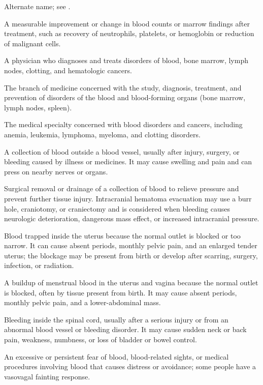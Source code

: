  Alternate name; see .

 A measurable improvement or change in blood counts or marrow findings after treatment, such as recovery of neutrophils, platelets, or hemoglobin or reduction of malignant cells.

 A physician who diagnoses and treats disorders of blood, bone marrow, lymph nodes, clotting, and hematologic cancers.

 The branch of medicine concerned with the study, diagnosis, treatment, and prevention of
disorders of the blood and blood-forming organs (bone marrow, lymph nodes, spleen).

 The medical specialty concerned with blood disorders and cancers, including anemia, leukemia, lymphoma, myeloma, and clotting disorders.

 A collection of blood outside a blood vessel, usually after injury, surgery, or bleeding caused by illness or medicines. It may cause swelling and pain and can press on nearby nerves or organs.

 Surgical removal or drainage of a collection of blood to relieve pressure and prevent further tissue injury. Intracranial hematoma evacuation may use a burr hole, craniotomy, or craniectomy and is considered when bleeding causes neurologic deterioration, dangerous mass effect, or increased intracranial pressure.

 Blood trapped inside the uterus because the normal outlet is blocked or too narrow. It can cause absent periods, monthly pelvic pain, and an enlarged tender uterus; the blockage may be present from birth or develop after scarring, surgery, infection, or radiation.

 A buildup of menstrual blood in the uterus and vagina because the normal outlet is blocked, often by tissue present from birth. It may cause absent periods, monthly pelvic pain, and a lower-abdominal mass.

 Bleeding inside the spinal cord, usually after a serious injury or from an abnormal blood vessel or bleeding disorder. It may cause sudden neck or back pain, weakness, numbness, or loss of bladder or bowel control.

 An excessive or persistent fear of blood, blood-related sights, or medical procedures involving blood that causes distress or avoidance; some people have a vasovagal fainting response.

